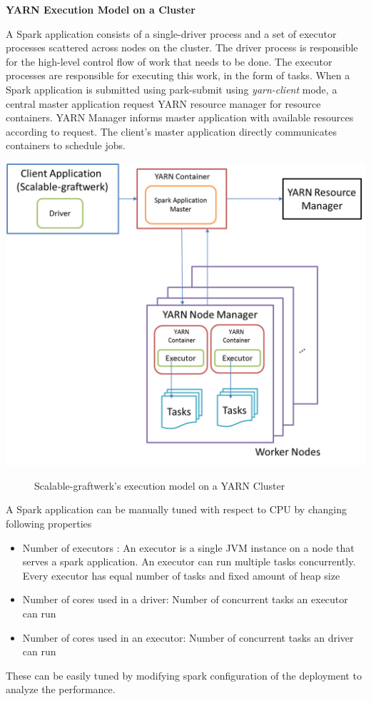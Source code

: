 \textbf{YARN Execution Model on a Cluster}

A Spark application consists of a single-driver process and a set of executor processes scattered across nodes on the cluster. The driver process  is responsible for the high-level control flow of work that needs to be done. The executor processes are responsible for executing this work, in the form of tasks. When a Spark application is submitted using park-submit using \textit{yarn-client} mode, a central master application request YARN resource manager for resource containers. YARN Manager informs master application with available resources according to request. The client's master application directly communicates containers to schedule jobs. 
\begin{center}
	\includegraphics[width=38em]{./Figures/scalable-graftwer-in-yarn-cluster}
	\begin{figure}[htbp]
    \caption{Scalable-graftwerk's execution model on a YARN Cluster}
    \label{fig:yarn-cluster-model}
	\end{figure}
\end{center}
A Spark application can be manually tuned with respect to CPU by changing following properties
\begin{itemize}
\item Number of executors : 	An executor is a single JVM instance on a node that serves a spark application. An executor can run multiple tasks concurrently. Every executor has equal number of tasks and fixed amount of heap size
\item Number of cores used in a driver: Number of concurrent tasks an executor can run
\item Number of cores used in an executor:  Number of concurrent tasks an driver can run
\end{itemize}
These can be easily tuned by modifying spark configuration of the deployment to analyze the performance. 

